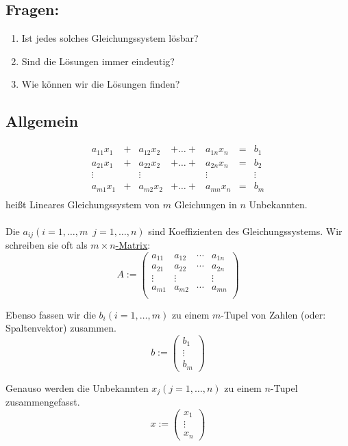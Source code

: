 \subsection{Fragen:}

\begin{enumerate}
\item Ist jedes solches Gleichungssystem lösbar?
\item Sind die Lösungen immer eindeutig?
\item Wie können wir die Lösungen finden?
\end{enumerate}

\subsection{Allgemein}

\[
\begin{matrix}
a_{11} x_1 & + & a_{12} x_2 & +  \ldots  + & a_{1n} x_n & = & b_1 \\
a_{21} x_1 & + & a_{22} x_2 & +  \ldots  + & a_{2n} x_n & = & b_2 \\
\vdots &  & \vdots &    & \vdots &  & \vdots \\
a_{m1} x_1 & + & a_{m2} x_2 & +  \ldots  + & a_{mn} x_n & = & b_m \\
\end{matrix}
\]
heißt \grqq Lineares Gleichungssystem von \( m \) Gleichungen in \( n \) Unbekannten\grqq. \\
\\
Die \( a_{ij} (i= 1, \dots , m \enspace j=1, \dots , n) \) sind Koeffizienten des Gleichungssystems. Wir schreiben sie oft als \underline{ \( m \times n \)-Matrix}:
\[
A := \begin{pmatrix}
a_{11} & a_{12} & \cdots & a_{1n} \\
a_{21} & a_{22} & \cdots & a_{2n} \\
\vdots & \vdots &  & \vdots \\
a_{m1} & a_{m2} & \cdots & a_{mn} \\
\end{pmatrix}
\]

Ebenso fassen wir die \( b_i (i=1, \dots, m) \) zu einem \( m \)-Tupel von Zahlen (oder: \grqq Spaltenvektor\grqq ) zusammen.
\[
b := \begin{pmatrix}
b_1 \\ \vdots \\ b_m
\end{pmatrix}
\]

Genauso werden die Unbekannten \( x_j (j= 1, \dots , n ) \) zu einem \( n \)-Tupel zusammengefasst.
\[
x := \begin{pmatrix}
x_1 \\ \vdots \\ x_n
\end{pmatrix}
\]

